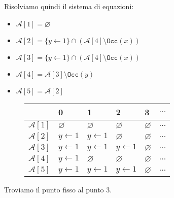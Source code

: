 Risolviamo quindi il sistema di equazioni:
\begin{itemize}
    \item $\mathcal{A}[1] = \varnothing$
    \item $\mathcal{A}[2] = \{y \gets 1\} \cap (\mathcal{A}[4] \setminus \texttt{Occ}(x))$
    \item $\mathcal{A}[3] = \{y \gets 1\} \cap (\mathcal{A}[4] \setminus \texttt{Occ}(x))$
    \item $\mathcal{A}[4] = \mathcal{A}[3] \setminus \texttt{Occ}(y)$
    \item $\mathcal{A}[5] = \mathcal{A}[2]$
\end{itemize}
\begin{figure}[H]
    \centering
    \renewcommand{\arraystretch}{2}
    \begin{tabular}{|>{\centering\arraybackslash}m{5em}|m{5em}|m{5em}|m{5em}|m{5em}|m{5em}|}
        \hline
        & \textbf{0} & \textbf{1} & \textbf{2} & \textbf{3} & \textbf{$\dots$} \\
        \hline
        $\mathcal{A}[1]$ & $\varnothing$ & $\varnothing$ & $\varnothing$ & $\varnothing$ & $\dots$ \\
        \hline
        $\mathcal{A}[2]$ & $y \gets 1$ & $y \gets 1$ & $\varnothing$ 
        & $\varnothing$ & $\dots$ \\
        \hline
        $\mathcal{A}[3]$ & $y \gets 1$ & $y \gets 1$ & $y \gets 1$ & $\varnothing$ & $\dots$ \\
        \hline
        $\mathcal{A}[4]$ & $y \gets 1$ &$\varnothing$ & $\varnothing$ & $\varnothing$ & $\dots$ \\
        \hline
        $\mathcal{A}[5]$ & $y \gets 1$ &$y \gets 1$ & $y \gets 1$ & $\varnothing$ & $\dots$ \\
        \hline
    \end{tabular}
\end{figure}
Troviamo il punto fisso al punto $3$.

